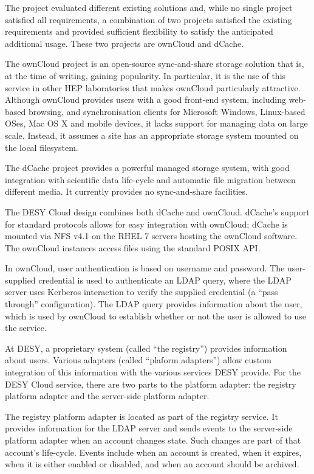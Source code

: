 \documentclass[a4paper]{jpconf}
\begin{document}
The project evaluated different existing solutions and, while no
single project satisfied all requirements, a combination of two
projects satisfied the existing requirements and provided sufficient
flexibility to satisfy the anticipated additional usage.  These two
projects are ownCloud\cite{owncloud-website} and dCache.

The ownCloud project is an open-source sync-and-share storage solution
that is, at the time of writing, gaining popularity.  In particular,
it is the use of this service in other HEP laboratories that makes
ownCloud particularly attractive.  Although ownCloud provides users
with a good front-end system, including web-based browsing, and
synchronisation clients for Microsoft Windows, Linux-based OSes, Mac
OS X and mobile devices, it lacks support for managing data on large
scale.  Instead, it assumes a site has an appropriate storage system
mounted on the local filesystem.

The dCache project provides a powerful managed storage system, with
good integration with scientific data life-cycle and automatic file
migration between different media.  It currently provides no
sync-and-share facilities.

The DESY Cloud design combines both dCache and ownCloud.  dCache's
support for standard protocols allows for easy integration with
ownCloud; dCache is mounted via NFS v4.1\cite{rfc5661} on the RHEL 7
servers hosting the ownCloud software.  The ownCloud instances access
files using the standard POSIX API.

In ownCloud, user authentication is based on username and password.
The user-supplied credential is used to authenticate an LDAP query,
where the LDAP server uses Kerberos interaction to verify the supplied
credential (a ``pass through'' configuration).  The LDAP query
provides information about the user, which is used by ownCloud to
establish whether or not the user is allowed to use the service.

At DESY, a proprietary system (called ``the registry'') provides
information about users.  Various adapters (called ``plaform
adapters'') allow custom integration of this information with the
various services DESY provide.  For the DESY Cloud service, there are
two parts to the platform adapter: the registry platform adapter and
the server-side platform adapter.

The registry platform adapter is located as part of the registry
service.  It provides information for the LDAP server and sends events
to the server-side platform adapter when an account changes state.
Such changes are part of that account's life-cycle.  Events include
when an account is created, when it expires, when it is either enabled
or disabled, and when an account should be archived.
\end{document}
